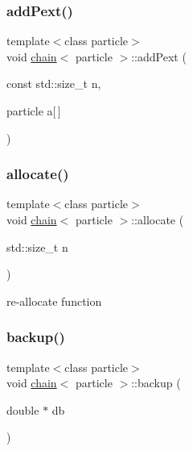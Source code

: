 \hypertarget{classchain_ae838fccf5313905d44690ef6cf08160d}{}\label{classchain_ae838fccf5313905d44690ef6cf08160d} 
\subsubsection{\texorpdfstring{add\+Pext()}{addPext()}\hspace{0.1cm}{\footnotesize\ttfamily [3/3]}}
{\footnotesize\ttfamily template$<$class particle$>$ \\
void \hyperlink{classchain}{chain}$<$ particle $>$\+::add\+Pext (\begin{DoxyParamCaption}\item[{const std\+::size\+\_\+t}]{n,  }\item[{particle}]{a\mbox{[}$\,$\mbox{]} }\end{DoxyParamCaption})\hspace{0.3cm}{\ttfamily [inline]}}

\hypertarget{classchain_a396b6a6ce8ed5e92dab4b6cf8ee0008d}{}\label{classchain_a396b6a6ce8ed5e92dab4b6cf8ee0008d} 
\subsubsection{\texorpdfstring{allocate()}{allocate()}}
{\footnotesize\ttfamily template$<$class particle$>$ \\
void \hyperlink{classchain}{chain}$<$ particle $>$\+::allocate (\begin{DoxyParamCaption}\item[{std\+::size\+\_\+t}]{n }\end{DoxyParamCaption})\hspace{0.3cm}{\ttfamily [inline]}}



re-\/allocate function 

\hypertarget{classchain_ac7b6422d8e7772461c4cde99916a4b6a}{}\label{classchain_ac7b6422d8e7772461c4cde99916a4b6a} 
\subsubsection{\texorpdfstring{backup()}{backup()}}
{\footnotesize\ttfamily template$<$class particle$>$ \\
void \hyperlink{classchain}{chain}$<$ particle $>$\+::backup (\begin{DoxyParamCaption}\item[{double $\ast$}]{db }\end{DoxyParamCaption})\hspace{0.3cm}{\ttfamily [inline]}}



